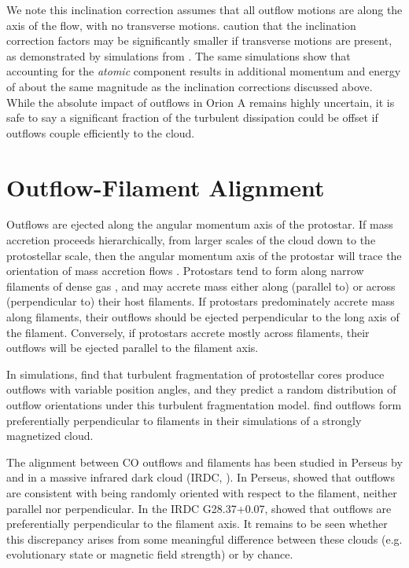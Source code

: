 \documentclass[twocolumn]{aastex63}
\begin{document}
We note this inclination correction assumes that all outflow motions are along the axis of the flow, with no transverse motions. \citet{Dunham14} caution that the inclination correction factors may be significantly smaller if transverse motions are present, as demonstrated by simulations from \citet{Downes07}. The same simulations show that accounting for the \emph{atomic} component results in additional momentum and energy of about the same magnitude as the inclination corrections discussed above. While the absolute impact of outflows in Orion A remains highly uncertain, it is safe to say a significant fraction of the turbulent dissipation could be offset if outflows couple efficiently to the cloud. %

\section{Outflow-Filament Alignment}\label{sec:filaments}
Outflows are ejected along the angular momentum axis of the protostar. If mass accretion proceeds hierarchically, from larger scales of the cloud down to the protostellar scale, then the angular momentum axis of the protostar will trace the orientation of mass accretion flows \citep{Bodenheimer95}. Protostars tend to form along narrow filaments of dense gas \citep{Arzoumanian11}, and may accrete mass either along (parallel to) or across (perpendicular to) their host filaments. If protostars predominately accrete mass along filaments, their outflows should be ejected perpendicular to the long axis of the filament. Conversely, if protostars accrete mostly across filaments, their outflows will be ejected parallel to the filament axis. 

In simulations, \citet{Offner16} find that turbulent fragmentation of protostellar cores produce outflows with variable position angles, and they predict a random distribution of outflow orientations under this turbulent fragmentation model. \citet{Li18} find outflows form preferentially perpendicular to filaments in their simulations of a strongly magnetized cloud. 

The alignment between CO outflows and filaments has been studied in Perseus by \citet{Stephens17} and in a massive infrared dark cloud (IRDC, \citealp{Kong19}). In Perseus, \citet{Stephens17} showed that outflows are consistent with being randomly oriented with respect to the filament, neither parallel nor perpendicular. In the IRDC G28.37+0.07, \cite{Kong19} showed that outflows are preferentially perpendicular to the filament axis. It remains to be seen whether this discrepancy arises from some meaningful difference between these clouds (e.g. evolutionary state or magnetic field strength) or by chance. 
\end{document}
